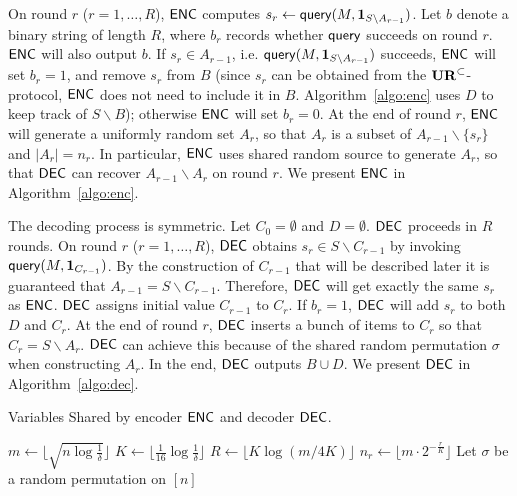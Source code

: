 On round $r$ ($r=1,\ldots, R$), $\textsf{ENC}$ computes $s_r\leftarrow \mathsf{query}(M, \mathbf{1}_{S\backslash A_{r-1}})$. 
Let $b$ denote a binary string of length $R$, where $b_r$ records whether $\mathsf{query}$ succeeds on round $r$. 
$\textsf{ENC}$ will also output $b$. 
If $s_r\in A_{r-1}$, i.e. $\mathsf{query}(M, \mathbf{1}_{S\backslash A_{r-1}})$ succeeds, $\textsf{ENC}$ will set $b_r=1$, and remove $s_r$ from $B$ 
(since $s_r$ can be obtained from the $\mathbf{UR}^\subset$-protocol, $\textsf{ENC}$ does not need to include it in $B$. Algorithm~\ref{algo:enc} uses $D$ to keep track of $S\backslash B$); 
otherwise $\textsf{ENC}$ will set $b_r=0$.
At the end of round $r$, $\textsf{ENC}$ will generate a uniformly random set $A_r$, so that $A_r$ is a subset of $A_{r-1}\backslash \{s_r\}$ and $|A_r|=n_r$. 
In particular, $\textsf{ENC}$ uses shared random source to generate $A_r$, so that $\textsf{DEC}$ can recover $A_{r-1}\backslash A_r$ on round $r$. 
We present $\textsf{ENC}$ in Algorithm~\ref{algo:enc}.

The decoding process is symmetric. 
Let $C_0=\emptyset$ and $D=\emptyset$. 
$\textsf{DEC}$ proceeds in $R$ rounds. 
On round $r$ ($r=1,\ldots,R$), $\textsf{DEC}$ obtains $s_r\in S\backslash C_{r-1}$ by invoking $\mathsf{query}(M, \mathbf{1}_{C_{r-1}})$. 
By the construction of $C_{r-1}$ that will be described later it is guaranteed that $A_{r-1}=S\backslash C_{r-1}$. 
Therefore, $\textsf{DEC}$ will get exactly the same $s_r$ as $\textsf{ENC}$. 
$\textsf{DEC}$ assigns initial value $C_{r-1}$ to $C_r$.
If $b_r=1$, $\textsf{DEC}$ will add $s_r$ to both $D$ and $C_r$.
At the end of round $r$, $\textsf{DEC}$ inserts a bunch of items to $C_r$ so that $C_r=S\backslash A_r$. 
$\textsf{DEC}$ can achieve this because of the shared random permutation $\sigma$ when constructing $A_r$.
In the end, $\textsf{DEC}$ outputs $B\cup D$.
We present $\textsf{DEC}$ in Algorithm~\ref{algo:dec}.

\begin{algorithm}[H] 
  \caption{Variables Shared by encoder $\textsf{ENC}$ and decoder $\textsf{DEC}$.} \label{algo:para}
  \begin{algorithmic}[1] 
    \State $m\leftarrow \lfloor \sqrt{n \log\frac{1}{\delta}} \rfloor$ 
    \State $K\leftarrow \lfloor \frac{1}{16}\log \frac{1}{\delta} \rfloor$
    \State $R\leftarrow \lfloor K\log(m/4K) \rfloor$
      \State $n_r\leftarrow \lfloor m \cdot 2^{-\frac{r}{K}} \rfloor$ 
    \EndFor
    \State Let $\sigma$ be a random permutation on $[n]$ 
  \end{algorithmic}
\end{algorithm}

